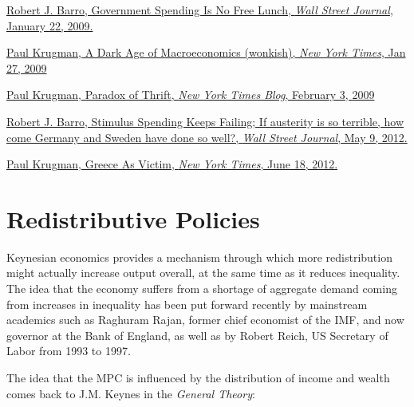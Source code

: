 \documentclass[]{book}
\begin{document}
\href{https://search.proquest.com/docview/399114897/CBD1D9A468D04A85PQ/2?accountid=14512}{Robert
J. Barro, Government Spending Is No Free Lunch, \emph{Wall Street
Journal}, January 22, 2009.}

\href{https://search.proquest.com/docview/1930920374/1A771BC8177A4FB7PQ/1?accountid=14512}{Paul
Krugman, A Dark Age of Macroeconomics (wonkish), \emph{New York Times},
Jan 27, 2009}

\href{https://search.proquest.com/docview/1930919033/3BCD850F469341AFPQ/1?accountid=14512}{Paul
Krugman, Paradox of Thrift, \emph{New York Times Blog}, February 3,
2009}

\href{https://search.proquest.com/nytimes/docview/1012047079/226EC4F8D3A49B0PQ/1?accountid=14512}{Robert
J. Barro, Stimulus Spending Keeps Failing; If austerity is so terrible,
how come Germany and Sweden have done so well?, \emph{Wall Street
Journal}, May 9, 2012.}

\href{https://search.proquest.com/docview/1020817739/fulltext/91FC1D36882C4B64PQ/1?accountid=14512}{Paul
Krugman, Greece As Victim, \emph{New York Times}, June 18, 2012.}

\hypertarget{redistributive}{\chapter{Redistributive
Policies}\label{redistributive}}

Keynesian economics provides a mechanism through which more
redistribution might actually increase output overall, at the same time
as it reduces inequality. The idea that the economy suffers from a
shortage of aggregate demand coming from increases in inequality has
been put forward recently by mainstream academics such as Raghuram
Rajan, former chief economist of the IMF, and now governor at the Bank
of England, as well as by Robert Reich, US Secretary of Labor from 1993
to 1997.

The idea that the MPC is influenced by the distribution of income and
wealth comes back to J.M. Keynes in the \emph{General Theory}:
\end{document}
